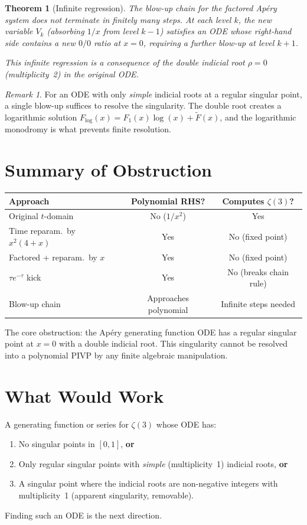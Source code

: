 \documentclass[11pt]{article}
\newtheorem{theorem}{Theorem}
\theoremstyle{definition}
\theoremstyle{remark}
\newtheorem{remark}{Remark}
\begin{document}
\begin{theorem}[Infinite regression]\label{thm:regression}
The blow-up chain for the factored Ap\'ery system does not terminate in finitely many steps. At each level $k$, the new variable $V_k$ (absorbing $1/x$ from level $k-1$) satisfies an ODE whose right-hand side contains a new $0/0$ ratio at $x=0$, requiring a further blow-up at level $k+1$.

This infinite regression is a consequence of the double indicial root $\rho = 0$ (multiplicity~2) in the original ODE.
\end{theorem}

\begin{remark}
For an ODE with only \emph{simple} indicial roots at a regular singular point, a single blow-up suffices to resolve the singularity. The double root creates a logarithmic solution $F_{\log}(x) = F_1(x)\log(x) + \tilde{F}(x)$, and the logarithmic monodromy is what prevents finite resolution.
\end{remark}

\section{Summary of Obstruction}

\begin{center}
\renewcommand{\arraystretch}{1.3}
\begin{tabular}{lcc}
\hline
\textbf{Approach} & \textbf{Polynomial RHS?} & \textbf{Computes $\zeta(3)$?} \\
\hline
Original $t$-domain & No ($1/x^2$) & Yes \\
Time reparam.\ by $x^2(4+x)$ & Yes & No (fixed point) \\
Factored + reparam.\ by $x$ & Yes & No (fixed point) \\
$\tau e^{-\tau}$ kick & Yes & No (breaks chain rule) \\
Blow-up chain & Approaches polynomial & Infinite steps needed \\
\hline
\end{tabular}
\end{center}

The core obstruction: the Ap\'ery generating function ODE has a regular singular point at $x=0$ with a double indicial root. This singularity cannot be resolved into a polynomial PIVP by any finite algebraic manipulation.

\section{What Would Work}

A generating function or series for $\zeta(3)$ whose ODE has:
\begin{enumerate}
  \item No singular points in $[0,1]$, \textbf{or}
  \item Only regular singular points with \emph{simple} (multiplicity~1) indicial roots, \textbf{or}
  \item A singular point where the indicial roots are non-negative integers with multiplicity~1 (apparent singularity, removable).
\end{enumerate}
Finding such an ODE is the next direction.
\end{document}
